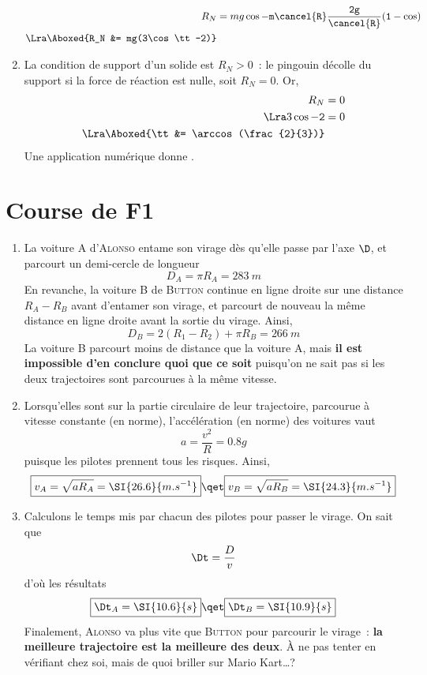 \documentclass[a4paper, 12pt, final, garamond]{book}
\begin{document}
\begin{enumerate}
\begin{align*}
            R_N &= mg\cos\tt -m\cancel{R}\frac{2g}{\cancel{R}}(1-\cos\tt)
            \\\Lra
            \Aboxed{R_N &= mg(3\cos\tt -2)}
        \end{align*}
    \item La condition de support d'un solide est $R_N > 0$~: le pingouin
        décolle du support si la force de réaction est nulle, soit $R_N = 0$.
        Or,
        \begin{align*}
            R_N &= 0
            \\\Lra
            3\cos\tt - 2 &=0
            \\\Lra
            \Aboxed{\tt &= \arccos(\frac{2}{3})}
        \end{align*}
        Une application numérique donne .
\end{enumerate}

\section{Course de F1}
\begin{enumerate}
    \item La voiture A d'\textsc{Alonso} entame son virage dès qu'elle passe par
        l'axe $\D$, et parcourt un demi-cercle de longueur
        \[\boxed{D_A = \pi R_A = \SI{283}{m}}\]
        En revanche, la voiture B de \textsc{Button} continue en ligne droite
        sur une distance $R_A-R_B$ avant d'entamer son virage, et parcourt de
        nouveau la même distance en ligne droite avant la sortie du virage.
        Ainsi,
        \[\boxed{D_B = 2(R_1-R_2) + \pi R_B = \SI{266}{m}}\]
        La voiture B parcourt moins de distance que la voiture A, mais
        \textbf{il est impossible d'en conclure quoi que ce soit} puisqu'on ne
        sait pas si les deux trajectoires sont parcourues à la même vitesse.
    \item Lorsqu'elles sont sur la partie circulaire de leur trajectoire,
        parcourue à vitesse constante (en norme), l'accélération (en norme) des
        voitures vaut
        \[a = \frac{v^2}{R} = \num{0.8}g\]
        puisque les pilotes prennent tous les risques. Ainsi,
        \[
            \boxed{v_A = \sqrt{aR_A} = \SI{26.6}{m.s^{-1}}}
            \qet
            \boxed{v_B = \sqrt{aR_B} = \SI{24.3}{m.s^{-1}}}
        \]
    \item Calculons le temps mis par chacun des pilotes pour passer le virage.
        On sait que
        \[\Dt = \frac{D}{v}\]
        d'où les résultats
        \[
            \boxed{\Dt_A = \SI{10.6}{s}}
            \qet
            \boxed{\Dt_B = \SI{10.9}{s}}
        \]
        Finalement, \textsc{Alonso} va plus vite que \textsc{Button} pour
        parcourir le virage~: \textbf{la meilleure trajectoire est la meilleure
        des deux}. À ne pas tenter en vérifiant chez soi, mais de quoi briller
        sur Mario Kart…?
\end{enumerate}
\end{document}
